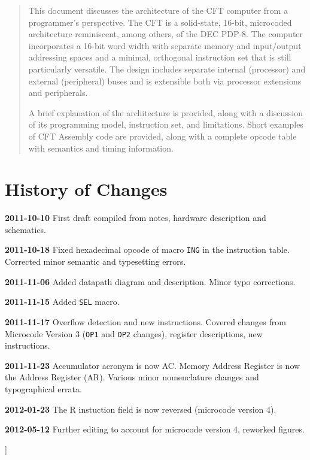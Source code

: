 \documentclass[11pt,a4paper,twocolumns]{article}
\newcommand\register[1]{\textsf{#1}}
\newcommand\A{\register{AC}}
\newcommand\AR{\register{AR}}
\begin{document}
\begin{minipage}{.75\textwidth}
  \begin{abstract}
    \small
    
  This document discusses the architecture of the CFT computer from a
  programmer's perspective. The CFT is a solid-state, 16-bit,
  microcoded architecture reminiscent, among others, of the DEC
  PDP-8. The computer incorporates a 16-bit word width with separate
  memory and input/output addressing spaces and a minimal, orthogonal
  instruction set that is still particularly versatile. The design
  includes separate internal (processor) and external (peripheral)
  buses and is extensible both via processor extensions and
  peripherals.

  A brief explanation of the architecture is provided, along with a
  discussion of its programming model, instruction set, and
  limitations. Short examples of CFT Assembly code are provided, along
  with a complete opcode table with semantics and timing information.
    
  \end{abstract}
  
  \section*{History of Changes}
  \small

  {\bf 2011-10-10} First draft compiled from notes, hardware description
  and schematics.

  {\bf 2011-10-18} Fixed hexadecimal opcode of macro {\tt ING} in the
  instruction table. Corrected minor semantic and typesetting errors.
  
  {\bf 2011-11-06} Added datapath diagram and description. Minor typo
  corrections.

  {\bf 2011-11-15} Added {\tt SEL} macro.

  {\bf 2011-11-17} Overflow detection and new instructions. Covered
  changes from Microcode Version 3 ({\tt OP1} and {\tt OP2} changes),
  register descriptions, new instructions.

  {\bf 2011-11-23} Accumulator acronym is now \A. Memory Address
  Register is now the Address Register (\AR). Various minor
  nomenclature changes and typographical errata.

  {\bf 2012-01-23} The {\sf R} instuction field is now reversed
  (microcode version 4).

  {\bf 2012-05-12} Further editing to account for microcode version 4,
  reworked figures.

  \vspace{5ex}
  
\end{minipage}
] %
\end{document}
